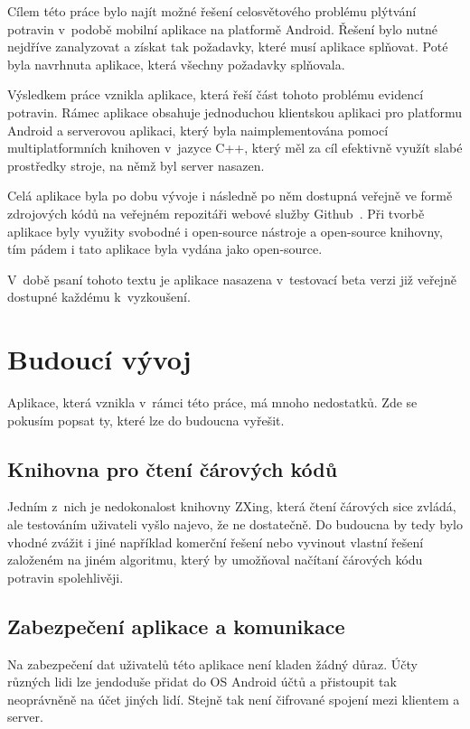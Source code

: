 \documentclass[thesis=B,czech]{FITthesis}[2013/10/20]
\begin{document}
\begin{conclusion}
Cílem této práce bylo najít možné řešení celosvětového problému plýtvání potravin v~podobě mobilní aplikace na platformě Android. Řešení bylo nutné nejdříve zanalyzovat a získat tak požadavky, které musí aplikace splňovat. Poté byla navrhnuta aplikace, která všechny požadavky splňovala.
	
Výsledkem práce vznikla aplikace, která řeší část tohoto problému evidencí potravin. Rámec aplikace obsahuje jednoduchou klientskou aplikaci pro platformu Android a serverovou aplikaci, který byla naimplementována pomocí multiplatformních knihoven v~jazyce C++, který měl za cíl efektivně využít slabé prostředky stroje, na němž byl server nasazen.

Celá aplikace byla po dobu vývoje i následně po něm dostupná veřejně ve formě zdrojových kódů na veřejném repozitáři webové služby Github~\cite{repo}. Při tvorbě aplikace byly využity svobodné i open-source nástroje a open-source knihovny, tím pádem i tato aplikace byla vydána jako open-source.

V~době psaní tohoto textu je aplikace nasazena v~testovací beta verzi již veřejně dostupné každému k~vyzkoušení.

\section{Budoucí vývoj}

Aplikace, která vznikla v~rámci této práce, má mnoho nedostatků. Zde se pokusím popsat ty, které lze do budoucna vyřešit.

\subsection{Knihovna pro čtení čárových kódů}
Jedním z~nich je nedokonalost knihovny ZXing, která čtení čárových sice zvládá, ale testováním uživateli vyšlo najevo, že ne dostatečně. Do budoucna by tedy bylo vhodné zvážit i jiné například komerční řešení nebo vyvinout vlastní řešení založeném na jiném algoritmu, který by umožňoval načítaní čárových kódu potravin spolehlivěji.

\subsection{Zabezpečení aplikace a komunikace}
Na zabezpečení dat uživatelů této aplikace není kladen žádný důraz. Účty různých lidi lze jendoduše přidat do OS Android účtů a přistoupit tak neoprávněně na účet jiných lidí. Stejně tak není čifrované spojení mezi klientem a server.


\end{conclusion}
\end{document}
